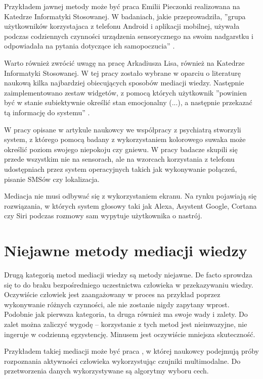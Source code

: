Przykładem jawnej metody może być praca Emilii Pieczonki realizowana na Katedrze Informatyki Stosowanej. W badaniach, jakie przeprowadziła, ''grupa użytkowników korzystajaca z telefonu Android i aplikacji mobilnej, używała podczas codziennych czynności urządzenia sensorycznego na swoim nadgarstku i odpowiadała na pytania dotyczące ich samopoczucia'' \cite{EmiliaPieczonka}.

Warto również zwrócić uwagę na pracę Arkadiusza Lisa, również na Katedrze Informatyki Stosowanej. W tej pracy zostało wybrane w oparciu o literaturę naukową kilka najbardziej obiecujących sposobów mediacji wiedzy. Następnie zaimplementowano zestaw widgetów, z pomocą których użytkownik ''powinien być w stanie subiektywnie określić stan emocjonalny (...), a następnie przekazać tą informację do systemu'' \cite{ArkadiuszLis}.

W pracy opisane w artykule \cite{hung2016predicting} naukowcy we współpracy z psychiatrą stworzyli system, z którego pomocą badany z wykorzystaniem kolorowego suwaka może określić poziom swojego niepokoju czy gniewu. W pracy badacze skupili się przede wszystkim nie na sensorach, ale na wzorcach korzystania z telefonu udostępniach przez system operacyjnych takich jak wykonywanie połączeń, pisanie SMSów czy lokalizacja.

Mediacja nie musi odbywać się z wykorzystaniem ekranu. Na rynku pojawiają się rozwiązania, w których system głosowy taki jak Alexa, Asystent Google, Cortana czy Siri podczas rozmowy sam wypytuje użytkownika o nastrój.



\section{Niejawne metody mediacji wiedzy}
\label{sec:niejawneMetodyMediacjiWiedzy}

Drugą kategorią metod mediacji wiedzy są metody niejawne. De facto sprowdza się to do braku bezpośredniego uczestnictwa człowieka w przekazywaniu wiedzy. Oczywiście człowiek jest zaangażowany w proces na przykład poprzez wykonywanie różnych czynności, ale nie zostanie nigdy zapytany wprost. Podobnie jak pierwsza kategoria, ta druga również ma swoje wady i zalety. Do zalet można zaliczyć wygodę -- korzystanie z tych metod jest nieinwazyjne, nie ingeruje w codzienną egzystencję. Minusem jest oczywiście mniejsza skuteczność.

Przykładem takiej mediacji może być praca \cite{zhang2011feature}, w której naukowcy podejmują próby rozpoznania aktywności człowieka wykorzystując czujniki multimodalne. Do przetworzenia danych wykorzystywane są algorytmy wyboru cech.

